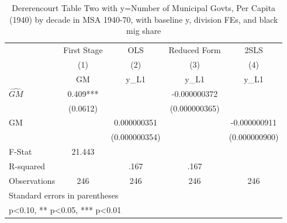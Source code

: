 \begin{table}[htbp]\centering
\def\sym#1{\ifmmode^{#1}\else\(^{#1}\)\fi}
\caption{Dererencourt Table Two with y=Number of Municipal Govts, Per Capita (1940) by decade in MSA 1940-70, with baseline y, division FEs, and black mig share}
\begin{tabular}{l*{4}{c}}
\toprule
                    & First Stage   &         OLS   &Reduced Form   &        2SLS   \\
                    &\multicolumn{1}{c}{(1)}&\multicolumn{1}{c}{(2)}&\multicolumn{1}{c}{(3)}&\multicolumn{1}{c}{(4)}\\
                    &\multicolumn{1}{c}{GM}&\multicolumn{1}{c}{y\_L1}&\multicolumn{1}{c}{y\_L1}&\multicolumn{1}{c}{y\_L1}\\
\midrule
$\hat{GM}$          &       0.409***&               &-0.000000372   &               \\
                    &    (0.0612)   &               &(0.000000365)   &               \\
\addlinespace
GM                  &               & 0.000000351   &               &-0.000000911   \\
                    &               &(0.000000354)   &               &(0.000000900)   \\
\midrule
F-Stat              &      21.443   &               &               &               \\
R-squared           &               &        .167   &        .167   &               \\
Observations        &         246   &         246   &         246   &         246   \\
\bottomrule
\multicolumn{5}{l}{\footnotesize Standard errors in parentheses}\\
\multicolumn{5}{l}{\footnotesize * p<0.10, ** p<0.05, *** p<0.01}\\
\end{tabular}
\end{table}
